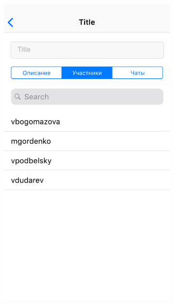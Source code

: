 \documentclass[a4paper,12pt]{article}
\begin{document}
\begin{figure}[h!]
		\begin{subfigure}[b]{0.3\linewidth}
			\includegraphics[width=\linewidth]{../includes/prototype/6.pdf}
		\end{subfigure}
		\begin{subfigure}[b]{0.3\linewidth}

\end{subfigure}
\end{figure}
\end{document}
